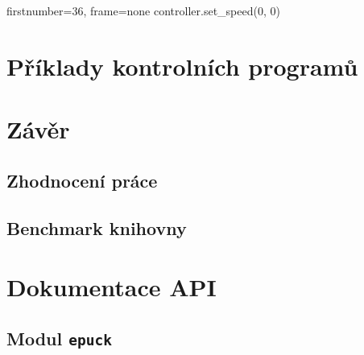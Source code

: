 \documentclass[12pt,notitlepage]{report}
\begin{document}
    \begin{pyc*}{firstnumber=36, frame=none}
    controller.set_speed(0, 0)
    \end{pyc*}

\chapter{Příklady kontrolních programů} %

\chapter{Závěr} %

    \section{Zhodnocení práce}

    \section{Benchmark knihovny}

\appendix

\chapter{Dokumentace API}%

\section{Modul {\tt epuck}}
\end{document}
